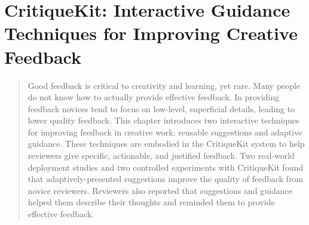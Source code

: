 \chapter{CritiqueKit: Interactive Guidance Techniques for Improving Creative Feedback}
\label{chapter:critiquekit}
\begin{quote}
    Good feedback is critical to creativity and learning, yet rare. Many people do not know how to actually provide effective feedback. In providing feedback novices tend to focus on low-level, superficial details, leading to lower quality feedback. This chapter introduces two interactive techniques for improving feedback in creative work: reusable suggestions and adaptive guidance. These techniques are embodied in the CritiqueKit system to help reviewers give specific, actionable, and justified feedback. Two real-world deployment studies and two controlled experiments with CritiqueKit found that adaptively-presented suggestions improve the quality of feedback from novice reviewers. Reviewers also reported that suggestions and guidance helped them describe their thoughts and reminded them to provide effective feedback.

\end{quote}






